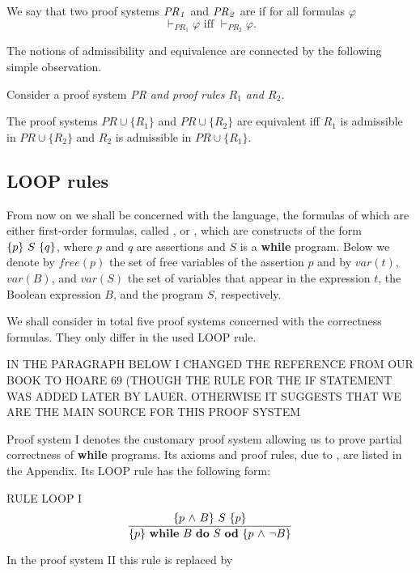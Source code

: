 \documentclass[runningheads]{llncs}       %
\begin{document}
We say that two proof systems $\it{PR}_1$ and $\it{PR}_2$ are 
if for all formulas $\varphi$
\[
 \mbox{$\vdash_{\mathit{PR}_1} \varphi$ iff $\vdash_{\mathit{PR}_2} \varphi$.}
\]

The notions of admissibility and equivalence are connected by the following simple observation.

\begin{lemma} \label{lem:equiv}
Consider a proof system \it{PR} and proof rules $R_1$ and $R_2$.

The proof systems $\mathit{PR} \cup \{R_1\}$ and
$\mathit{PR} \cup \{R_2\}$ are equivalent iff $R_1$ is admissible in
$\mathit{PR} \cup \{R_2\}$ and $R_2$ is admissible in
$\mathit{PR} \cup \{R_1\}$.

\end{lemma}

\subsection{LOOP rules}

From now on we shall be concerned with the language, the formulas of
which are either first-order formulas, called , or
, which are constructs of the form $\mbox{$\{{p}\}\ {S}\ \{{q}\}$}$,
where $p$ and $q$ are assertions and $S$ is a \textbf{while} program.
Below we denote by $\mathit{free}(p)$
the set of free variables of the assertion $p$ and by $var(t)$, $var(B)$, and $var(S)$ 
the set of variables that appear in the
expression $t$, the Boolean expression $B$, and the program $S$, respectively.

We shall consider in total five  proof systems concerned with the correctness
formulas. They only differ in the used LOOP rule.  

IN THE PARAGRAPH BELOW I CHANGED THE REFERENCE FROM OUR BOOK TO HOARE 69 (THOUGH THE RULE FOR THE IF
STATEMENT WAS ADDED LATER BY LAUER. OTHERWISE IT SUGGESTS THAT WE ARE THE MAIN SOURCE FOR THIS PROOF SYSTEM

Proof system I denotes the customary proof system allowing us to prove 
partial correctness of {\bf while} programs.  
Its axioms and proof rules, due to \cite{Hoa69}, are listed in the Appendix.
Its LOOP rule has the following form:
\III

\NI
RULE LOOP I
\[ 
 \frac{ \mbox{$\{{p \mbox{$\ \wedge\ $} B}\}\ {S}\ \{{p}\}$}                }
      { \mbox{$\{{p}\}\ {\mbox{$\mbox{{\bf while}\ } {B}\ \mbox{{\bf do}\ } {S}\ \mbox{{\bf od}}$}}\ \{{p \mbox{$\ \wedge\ $} \neg B}\}$}  }
\]
\III

In the proof system II this rule  is replaced by
\III
\end{document}
